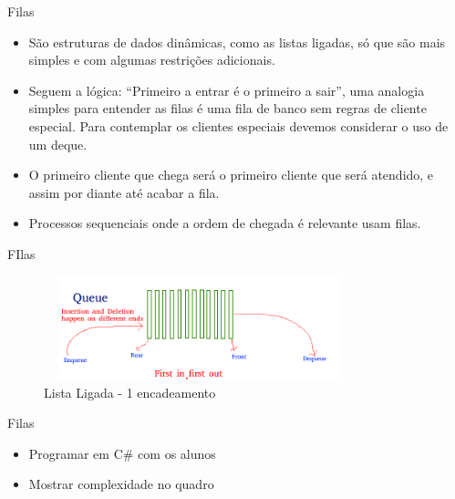 \begin{frame}
	\begin{block}{Filas}
		\begin{itemize}
			\item São estruturas de dados dinâmicas, como as listas ligadas, só que são mais simples e com algumas restrições adicionais.
			
			\item Seguem a lógica: “Primeiro a entrar é o primeiro a sair”, uma analogia simples para entender as filas é uma fila de banco sem regras de cliente especial. Para contemplar os clientes especiais devemos considerar o uso de um deque.
			
			\item O primeiro cliente que chega será o primeiro cliente que será atendido, e assim por diante até acabar a fila.
			
			\item Processos sequenciais onde a ordem de chegada é relevante usam filas. 
		\end{itemize}
	\end{block}
\end{frame}


\begin{frame}
	\begin{block}{FIlas}
		\begin{figure}[!htb]
			\centering	  				
			\includegraphics[height=3cm, width = 9cm]{./pic/queue.png}
			\caption{Lista Ligada - 1 encadeamento}
			\label{fig_LLS_one}
		\end{figure}
	\end{block}
\end{frame}

\begin{frame}
	\begin{block}{Filas}
		\begin{itemize}
			\item Programar em C\# com os alunos
			\item Mostrar complexidade no quadro
		\end{itemize}
	\end{block}
\end{frame}